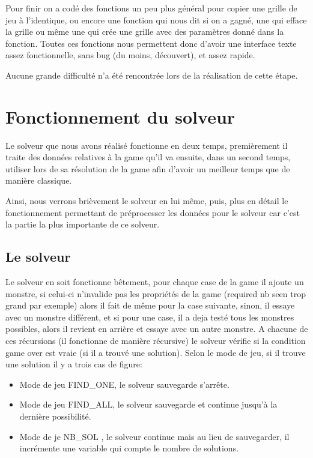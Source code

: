 \documentclass[12]{article}
\begin{document}
Pour finir on a codé des fonctions un peu plus général pour copier une grille de jeu à l'identique, ou encore une fonction qui nous dit si on a gagné, une qui efface la grille ou même une qui crée une grille avec des paramètres donné dans la fonction. Toutes ces fonctions nous permettent donc d'avoir une interface texte assez fonctionnelle, sans bug (du moins, découvert), et assez rapide.

Aucune grande difficulté n'a été rencontrée lors de la réalisation de cette étape. 

\section{Fonctionnement du solveur}
Le solveur que nous avons réalisé fonctionne en deux temps, premièrement il traite des données relatives à la game qu'il va ensuite, dans un second temps, utiliser lors de sa résolution de la game afin d'avoir un meilleur temps que de manière classique.

Ainsi, nous verrons brièvement le solveur en lui même, puis, plus en détail le fonctionnement permettant de préprocesser les données pour le solveur car c'est la partie la plus importante de ce solveur.


\subsection{Le solveur}
Le solveur en soit fonctionne bêtement, pour chaque case de la game il ajoute un monstre, si celui-ci n'invalide pas les propriétés de la game (required nb seen trop grand par exemple) alors il fait de même pour la case suivante, sinon, il essaye avec un monstre différent, et si pour une case, il a deja testé tous les monstres possibles, alors il revient en arrière et essaye avec un autre monstre.
\medbreak
A chacune de ces récursions (il fonctionne de manière récursive) le solveur vérifie si la condition game over est vraie (si il a trouvé une solution).
\medbreak
Selon le mode de jeu, si il trouve une solution il y a trois cas de figure:
\begin{itemize}
\item Mode de jeu FIND\_ONE, le solveur sauvegarde s'arrête.
\item Mode de jeu FIND\_ALL, le solveur sauvegarde et continue jusqu'à la dernière possibilité.
\item Mode de je NB\_SOL , le solveur continue mais au lieu de sauvegarder, il incrémente une variable qui compte le nombre de solutions.
\end{itemize}
\bigbreak
\end{document}
